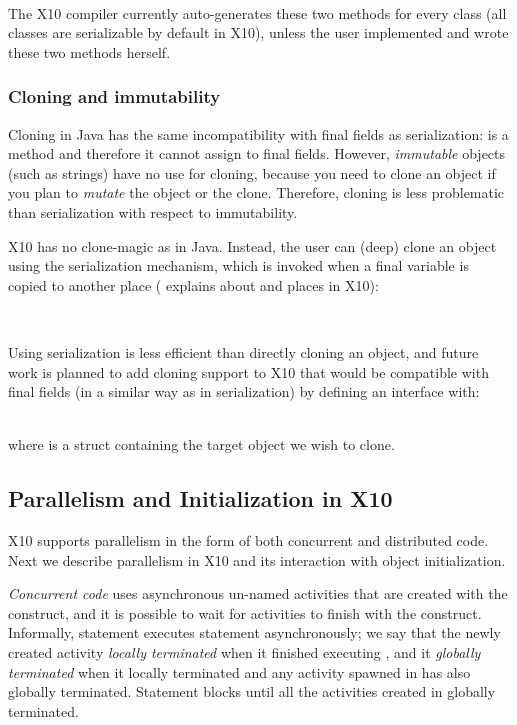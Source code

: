 ~~~~~~~~\\
The X10 compiler currently auto-generates these two methods for every class (all classes are serializable by default in X10),
    unless the user implemented  and wrote these two methods herself.

\subsubsection{Cloning and immutability}
\label{Section:Cloning}
Cloning in Java has the same incompatibility with final fields as serialization:
     is a method and therefore it cannot assign to final fields.
However, \emph{immutable} objects (such as strings) have no use for cloning,
    because you need to clone an object if you plan to \emph{mutate} the object or the clone.
Therefore, cloning is less problematic than serialization with respect to immutability.

X10 has no clone-magic as in Java.
Instead, the user can (deep) clone an object using the serialization mechanism,
    which is invoked when a final variable is copied to another place
    ( explains about  and places in X10):

~~~~~~~~

Using serialization is less efficient than directly cloning an object,
    and future work is planned to add cloning support to X10
    that would be compatible with final fields
    (in a similar way as in serialization) by defining an interface  with:

~~~~~~~~\\
where  is a struct containing the target object we wish to clone.




\subsection{Parallelism and Initialization in X10}
\label{Section:Parallelism}
X10 supports parallelism in the form of both concurrent and distributed code.
Next we describe parallelism in X10 and its interaction with object initialization.

\emph{Concurrent code} uses asynchronous un-named activities that are created with the  construct,
    and it is possible to wait for activities to finish with the  construct.
Informally, statement  executes statement  asynchronously;
    we say that the newly created activity \emph{locally terminated} when it finished executing ,
        and it \emph{globally terminated} when it locally terminated and any activity spawned in 
            has also globally terminated.
Statement  blocks until all the activities created in  globally terminated.

